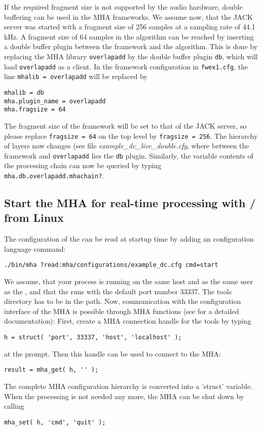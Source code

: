 If the required fragment size is not supported by the audio hardware,
double buffering can be used in the MHA frameworks. We assume now,
that the JACK server was started with a fragment size of 256 samples at
a sampling rate of 44.1 kHz. A fragment size of 64 samples in the algorithm 
can be reached by inserting a double buffer plugin between the framework and the algorithm. This is
done by replacing the MHA library \verb!overlapadd! by the double
buffer plugin \verb!db!, which will load \verb!overlapadd! as a
client. In the framework configuration in \verb!fwex1.cfg!, the line
\verb!mhalib = overlapadd! will be replaced by
\begin{verbatim}
mhalib = db
mha.plugin_name = overlapadd
mha.fragsize = 64
\end{verbatim}
The fragment size of the framework will be set to that of the JACK
server, so please replace \verb!fragsize = 64! on the top level by
\verb!fragsize = 256!. The hierarchy of layers now changes (see 
file \emph{example\_dc\_live\_double.cfg}, where between the framework 
and \verb!overlapadd! lies the \verb!db! plugin.
Similarly, the variable contents of the processing chain can now be
queried by typing \verb!mha.db.overlapadd.mhachain?!.

\subsection{Start the MHA for real-time processing with \Octave{}/\Matlab{} from Linux}%
%

The configuration of the \mhad{} can be
read at startup time by adding an \mha{} configuration language command:
%
\begin{verbatim}
./bin/mha ?read:mha/configurations/example_dc.cfg cmd=start
\end{verbatim}
%
We assume, that your \Matlab{} process is running on the same host and
as the same user as the \mha{}, and that the \mhad{} runs with the
default port number 33337.
%
The \mha{} \Matlab{} tools directory has to be in the \Matlab{} path.
%
Now, communication with the configuration interface of the MHA is
possible through MHA \Matlab{} functions (see 
for a detailed documentation):
%
First, create a MHA connection handle for the \Matlab{} tools by
typing
\begin{verbatim}
h = struct( 'port', 33337, 'host', 'localhost' );
\end{verbatim}
at the \Matlab{} prompt. Then this handle can be used to connect to
the MHA:
%
\begin{verbatim}
result = mha_get( h, '' );
\end{verbatim}
%
The complete MHA configuration hierarchy is converted into a \Matlab{}
'struct' variable.
%
When the \mha{} processing is not needed any more, the MHA can be shut
down by calling
%
\begin{verbatim}
mha_set( h, 'cmd', 'quit' );
\end{verbatim}


